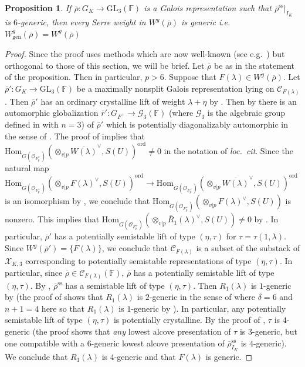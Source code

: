 \documentclass[oneside,a4paper,english, 11pt]{amsart}
\theoremstyle{plain}
\theoremstyle{plain}
\newtheorem{prop}[thm]{Proposition}
\theoremstyle{plain}
\theoremstyle{plain}
\theoremstyle{plain}
\theoremstyle{plain}
\theoremstyle{definition}
\theoremstyle{definition}
\theoremstyle{definition}
\theoremstyle{remark}
\numberwithin{equation}{section}
\newcommand{\F}{\mathbb{F}}
\newcommand{\cC}{\mathcal{C}}
\newcommand{\cG}{\mathcal{G}}
\newcommand{\cO}{\mathcal{O}}
\newcommand{\cX}{\mathcal{X}}
\newcommand{\Hom}{\mathrm{Hom}}
\newcommand{\GL}{\mathrm{GL}}
\newcommand{\semis}{\mathrm{ss}}
\newcommand{\rbar}{\overline{r}}
\newcommand{\rhobar}{\overline{\rho}}
\newcommand{\ovl}[1]{\overline{#1}}
\newcommand{\ra}{\rightarrow}
\begin{document}
\begin{prop}\label{prop:gWE}
If $\rhobar: G_K \ra \GL_3(\F)$ is a Galois representation such that $\rhobar^{\semis}|_{I_K}$ is $6$-generic, then every Serre weight in $W^g(\rhobar)$ is generic i.e.~$W^g_{\mathrm{gen}}(\rhobar)= W^g(\rhobar)$
\end{prop}
\begin{proof}
Since the proof uses methods which are now well-known (see e.g.~\cite[\S 3]{GHLS}) but orthogonal to those of this section, we will be brief. 
Let $\rhobar$ be as in the statement of the proposition. 
Then in particular, $p > 6$. 
Suppose that $F(\lambda) \in W^g(\rhobar)$. 
Let $\rhobar': G_K \ra \GL_3(\F)$ be a maximally nonsplit Galois representation lying on $\cC_{F(\lambda)}$. 
Then $\rhobar'$ has an ordinary crystalline lift of weight $\lambda+\eta$ by \cite[Lemma 5.5.4]{EGstack}. 
Then by \cite[Corollary A.7]{EG} there is an automorphic globalization $\rbar': G_{F^+} \ra \cG_3(\F)$ (where $\cG_3$ is the algebraic group defined in \cite[\S 2.1]{CHT} with $n=3$) of $\rhobar'$ which is potentially diagonalizably automorphic in the sense of \cite[Theorem 4.3.1]{LLL}. 
The proof of \cite[Theorem 4.3.8]{LLL} implies that $\Hom_{G(\cO_{F^+_p})}(\otimes_{v|p} \ovl{W(\lambda)}^\vee,S(U))^{\mathrm{ord}} \neq 0$ in the notation of \emph{loc.~cit}. 
Since the natural map $\Hom_{G(\cO_{F^+_p})}(\otimes_{v|p} F(\lambda)^\vee,S(U))^{\mathrm{ord}} \ra \Hom_{G(\cO_{F^+_p})}(\otimes_{v|p} \ovl{W(\lambda)}^\vee,S(U))^{\mathrm{ord}}$ is an isomorphism by \cite[Lemma 6.1.3]{gee-geraghty}, we conclude that $\Hom_{G(\cO_{F^+_p})}(\otimes_{v|p} F(\lambda)^\vee,S(U))$ is nonzero. 
This implies that $\Hom_{G(\cO_{F^+_p})}(\otimes_{v|p} \ovl{R}_1(\lambda)^\vee,S(U)) \neq 0$ by \cite[Lemma 2.3]{florian-inv}. 
In particular, $\rhobar'$ has a potentially semistable lift of type $(\eta,\tau)$ for $\tau = \tau(1,\lambda)$. 
Since $W^g(\rhobar') = \{F(\lambda)\}$, we conclude that $\cC_{F(\lambda)}$ is a subset of the substack of $\cX_{K,3}$ corresponding to potentially semistable representations of type $(\eta,\tau)$. 
%
In particular, since $\rhobar \in \cC_{F(\lambda)}(\F)$, $\rhobar$ has a potentially semistable lift of type $(\eta,\tau)$. 
By \cite[Lemma 5]{Enns}, $\rhobar^\semis$ has a semistable lift of type $(\eta,\tau)$. 
Then $R_1(\lambda)$ is $1$-generic by \cite[Proposition 7]{Enns} (the proof of \cite[Theorem 8]{Enns} shows that $R_1(\lambda)$ is $2$-generic in the sense of \cite[Definition 2]{Enns} where $\delta = 6$ and $n+1 = 4$ here so that $R_1(\lambda)$ is $1$-generic by \cite[Remark 2.2.8]{LLL}). 
In particular, any potentially semistable lift of type $(\eta,\tau)$ is potentially crystalline. 
By the proof of \cite[Proposition 3.3.2]{LLL}, $\tau$ is $4$-generic (the proof shows that \emph{any} lowest alcove presentation of $\tau$ is $3$-generic, but one compatible with a $6$-generic lowest alcove presentation of $\rhobar^{\semis}_{I_K}$ is $4$-generic). 
We conclude that $R_1(\lambda)$ is $4$-generic and that $F(\lambda)$ is generic. 
\end{proof}
\end{document}
